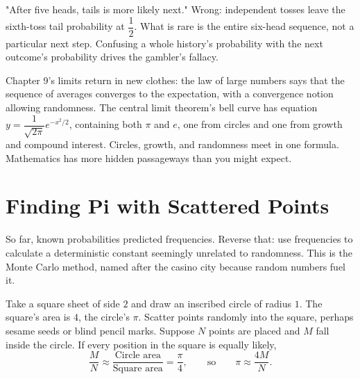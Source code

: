 \begin{fanli}
"After five heads, tails is more likely next." Wrong: independent tosses leave the sixth-toss tail probability at $\dfrac{1}{2}$. What is rare is the entire six-head sequence, not a particular next step. Confusing a whole history's probability with the next outcome's probability drives the gambler's fallacy.
\end{fanli}

\begin{lianjie}
Chapter 9's limits return in new clothes: the law of large numbers says that the sequence of averages converges to the expectation, with a convergence notion allowing randomness. The central limit theorem's bell curve has equation $y=\dfrac{1}{\sqrt{2\pi}}e^{-x^2/2}$, containing both $\pi$ and $e$, one from circles and one from growth and compound interest. Circles, growth, and randomness meet in one formula. Mathematics has more hidden passageways than you might expect.
\end{lianjie}

\section{Finding Pi with Scattered Points}

So far, known probabilities predicted frequencies. Reverse that: use frequencies to calculate a deterministic constant seemingly unrelated to randomness. This is the Monte Carlo method, named after the casino city because random numbers fuel it.

Take a square sheet of side $2$ and draw an inscribed circle of radius $1$. The square's area is $4$, the circle's $\pi$. Scatter points randomly into the square, perhaps sesame seeds or blind pencil marks. Suppose $N$ points are placed and $M$ fall inside the circle. If every position in the square is equally likely,
\[
\frac{M}{N}\approx \frac{\text{Circle area}}{\text{Square area}}=\frac{\pi}{4},
\qquad\text{so}\qquad
\pi\approx \frac{4M}{N}.
\]

\begin{center}
\end{center}

